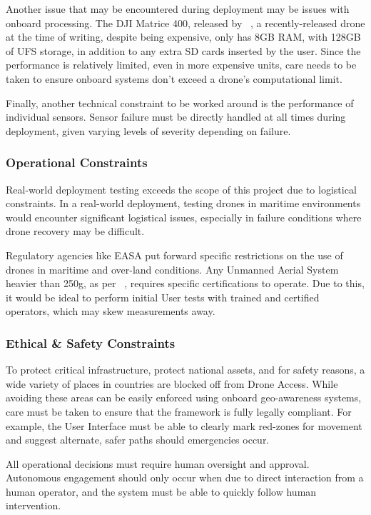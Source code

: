 Another issue that may be encountered during deployment may be issues with onboard processing.
The DJI Matrice 400, released by ~\cite{DJI_Matrice400_Specs}, a recently-released drone at the time of writing, despite being expensive, only has 8GB RAM, with 128GB of UFS storage, in addition to any extra SD cards inserted by the user.
Since the performance is relatively limited, even in more expensive units, care needs to be taken to ensure onboard systems don't exceed a drone's computational limit.

Finally, another technical constraint to be worked around is the performance of individual sensors.
Sensor failure must be directly handled at all times during deployment, given varying levels of severity depending on failure.

\subsubsection{Operational Constraints}
Real-world deployment testing exceeds the scope of this project due to logistical constraints.
In a real-world deployment, testing drones in maritime environments would encounter significant logistical issues, especially in failure conditions where drone recovery may be difficult.

Regulatory agencies like EASA put forward specific restrictions on the use of drones in maritime and over-land conditions.
Any Unmanned Aerial System heavier than 250g, as per ~\cite{open_category_easa}, requires specific certifications to operate.
Due to this, it would be ideal to perform initial User tests with trained and certified operators, which may skew measurements away.

\subsubsection{Ethical \& Safety Constraints}
To protect critical infrastructure, protect national assets, and for safety reasons, a wide variety of places in countries are blocked off from Drone Access.
While avoiding these areas can be easily enforced using onboard geo-awareness systems, care must be taken to ensure that the framework is fully legally compliant.
For example, the User Interface must be able to clearly mark red-zones for movement and suggest alternate, safer paths should emergencies occur.

All operational decisions must require human oversight and approval.
Autonomous engagement should only occur when due to direct interaction from a human operator, and the system must be able to quickly follow human intervention.


